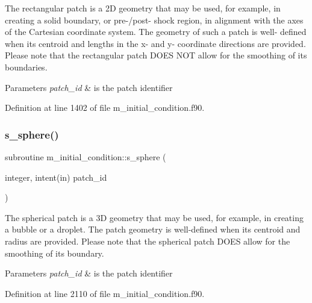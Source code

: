 The rectangular patch is a 2D geometry that may be used, for example, in creating a solid boundary, or pre-\//post-\/ shock region, in alignment with the axes of the Cartesian coordinate system. The geometry of such a patch is well-\/ defined when its centroid and lengths in the x-\/ and y-\/ coordinate directions are provided. Please note that the rectangular patch D\+O\+ES N\+OT allow for the smoothing of its boundaries. 


\begin{DoxyParams}{Parameters}
{\em patch\+\_\+id} & is the patch identifier \\
\hline
\end{DoxyParams}


Definition at line 1402 of file m\+\_\+initial\+\_\+condition.\+f90.

\mbox{\label{namespacem__initial__condition_a9037159f591341d05fa5fb23fe82bc2c}} 
\subsubsection{\texorpdfstring{s\+\_\+sphere()}{s\_sphere()}}
{\footnotesize\ttfamily subroutine m\+\_\+initial\+\_\+condition\+::s\+\_\+sphere (\begin{DoxyParamCaption}\item[{integer, intent(in)}]{patch\+\_\+id }\end{DoxyParamCaption})}



The spherical patch is a 3D geometry that may be used, for example, in creating a bubble or a droplet. The patch geometry is well-\/defined when its centroid and radius are provided. Please note that the spherical patch D\+O\+ES allow for the smoothing of its boundary. 


\begin{DoxyParams}{Parameters}
{\em patch\+\_\+id} & is the patch identifier \\
\hline
\end{DoxyParams}


Definition at line 2110 of file m\+\_\+initial\+\_\+condition.\+f90.

\mbox{\label{namespacem__initial__condition_af17f90ba4a3878feb6e38bc8d66cb950}} 
